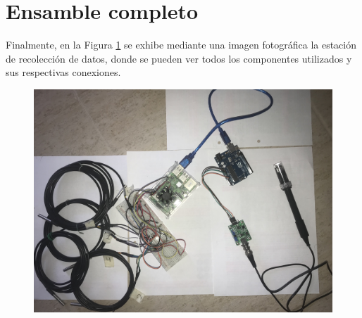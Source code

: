 \section{Ensamble completo}

    \par Finalmente, en la Figura \ref{fig:EsquemaCompletoHardware} se exhibe mediante una imagen fotográfica la estación de recolección de datos, donde se pueden ver todos los componentes utilizados y sus respectivas conexiones.
    

    \begin{figure}[H]
    \centering
        \includegraphics[scale=0.09]{hardware/SistemaEnsamblado.jpeg}
        \label{fig:EsquemaCompletoHardware}
    \end{figure}

    
